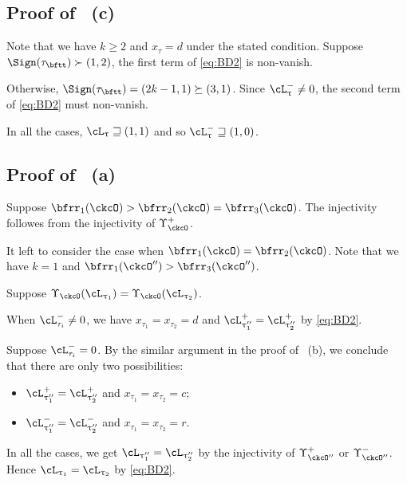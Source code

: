 \documentclass[12pt,a4paper]{amsart}
\numberwithin{equation}{section}
\theoremstyle{remark}
\def\PBPes{\mathrm{PBP}^{\mathrm{ext}}_{\star}}
\begin{document}
  \subsection*{\bf Proof of ~(c)}

  Note that we have $k\geq 2$ and $x_{\tau}=d$ under the stated condition.
  Suppose $\Sign( {\tau}_{\bftt} )\succ (1,2)$, the
  first term of \eqref{eq:BD2} is non-vanish.

  Otherwise, $\Sign( \tau_{\bftt} ) = (2k-1,1)\succeq (3,1)$.
  Since $\nac{\uptau}\neq 0$, the second term of \eqref{eq:BD2} must
  non-vanish.

 In all the cases,  $\ac_{\uptau}\sqsupseteq (1,1)$ and so  $\nac{\uptau}\sqsupseteq (1,0)$.


\subsection*{\bf Proof of ~(a)}

Suppose $\bfrr_{1}(\ckcO)>\bfrr_{2}(\ckcO)=\bfrr_{3}(\ckcO)$. The injectivity
followes from the injectivity of $\Upsilon_{\ckcO}^{+}$.

It left to consider the case when $\bfrr_{1}(\ckcO)=\bfrr_{2}(\ckcO)$.
Note that we have $k=1$ and $\bfrr_{1}(\ckcO'')>\bfrr_{3}(\ckcO'')$.

Suppose $\Upsilon_{\ckcO}(\ac_{\uptau_{1}}) = \Upsilon_{\ckcO}(\ac_{\uptau_{2}})$.

When $\nac{ \tau_{i} }\neq 0$, we have $x_{\tau_{1}}=x_{\tau_{2}}=d$ and
$\pac{\uptau''_{1}} = \pac{\uptau''_{2}}$ by \eqref{eq:BD2}.

Suppose $\nac{ \tau_{i} }=0$.
By the similar argument in the proof of ~(b),
we conclude that there are only two possibilities:
\begin{itemize}
  \item $\pac{\uptau''_{1}} = \pac{\uptau''_{2}}$ and
  $x_{\tau_{1}}=x_{\tau_{2}} = c$;
  \item $\nac{\uptau''_{1}} = \nac{\uptau''_{2}}$ and
  $x_{\tau_{1}}=x_{\tau_{2}} = r$.
\end{itemize}

In all the cases,  we get $\ac_{\uptau''_{1}}=\ac_{\uptau''_{2}}$ by the
injectivity of $\Upsilon_{\ckcO''}^{+}$ or $\Upsilon_{\ckcO''}^{-}$.
Hence $\ac_{\uptau_{1}}=\ac_{\uptau_{2}}$ by \eqref{eq:BD2}.
\end{document}
